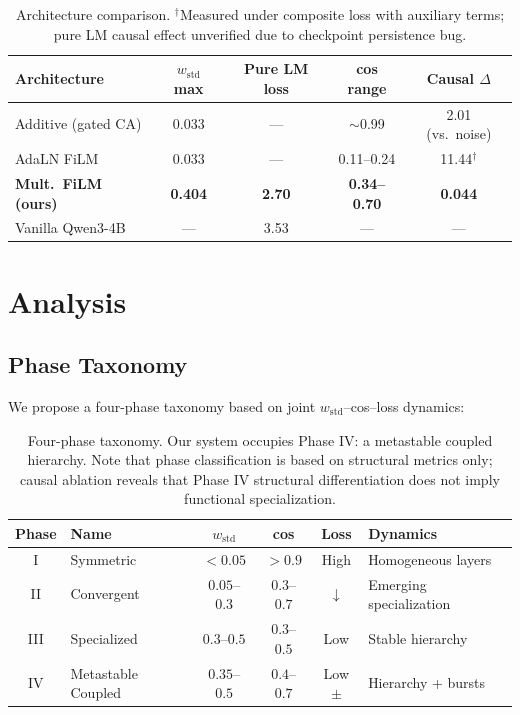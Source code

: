 \documentclass[11pt,a4paper]{article}
\begin{document}
\begin{table}[h]
\centering
\begin{tabular}{lcccc}
\toprule
\textbf{Architecture} & $w_{\mathrm{std}}$ max & Pure LM loss & cos range & Causal $\Delta$ \\
\midrule
Additive (gated CA)    & 0.033 & ---  & $\sim$0.99   & 2.01 (vs.\ noise)  \\
AdaLN FiLM             & 0.033 & ---  & 0.11--0.24   & 11.44$^\dagger$ \\
\textbf{Mult.\ FiLM (ours)} & \textbf{0.404} & \textbf{2.70} & \textbf{0.34--0.70} & \textbf{0.044} \\
Vanilla Qwen3-4B       & ---   & 3.53 & ---          & --- \\
\bottomrule
\end{tabular}
\caption{Architecture comparison. $^\dagger$Measured under composite loss with
auxiliary terms; pure LM causal effect unverified due to checkpoint persistence bug.}
\end{table}

\section{Analysis}

\subsection{Phase Taxonomy}

We propose a four-phase taxonomy based on joint $w_{\mathrm{std}}$--cos--loss
dynamics:

\begin{table}[h]
\centering
\begin{tabular}{clccc p{4.5cm}}
\toprule
\textbf{Phase} & \textbf{Name} & $w_{\mathrm{std}}$ & \textbf{cos} & \textbf{Loss} & \textbf{Dynamics} \\
\midrule
I   & Symmetric             & $<0.05$      & $>0.9$     & High   & Homogeneous layers \\
II  & Convergent            & $0.05$--$0.3$& $0.3$--$0.7$& $\downarrow$ & Emerging specialization \\
III & Specialized           & $0.3$--$0.5$ & $0.3$--$0.5$& Low    & Stable hierarchy \\
IV  & Metastable Coupled    & $0.35$--$0.5$& $0.4$--$0.7$& Low$\pm$ & Hierarchy + bursts \\
\bottomrule
\end{tabular}
\caption{Four-phase taxonomy. Our system occupies Phase IV: a metastable coupled
hierarchy. Note that phase classification is based on structural metrics only;
causal ablation reveals that Phase IV structural differentiation does not imply
functional specialization.}
\end{table}
\end{document}
